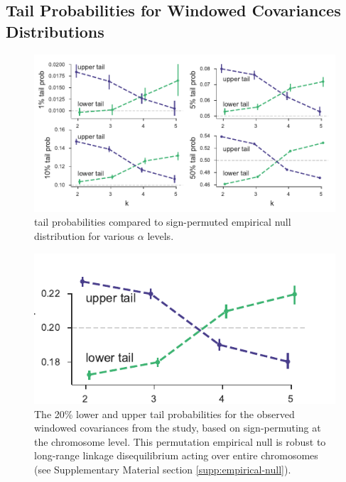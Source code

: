 \documentclass[11pt]{article}
\begin{document}
\clearpage
\subsection{\textcite{Barghi2019-qy} Tail Probabilities for Windowed Covariances Distributions}

\begin{figure}[!ht]
  \centering
  \includegraphics[]{figures/barghi-tailprobs-panels.pdf}

  \caption{\textcite{Barghi2019-qy} tail probabilities compared to
  sign-permuted empirical null distribution for various $\alpha$ levels.}

  \label{suppfig:barghi-tailprobs-panels}
\end{figure}

\begin{figure}[!ht]
  \centering

  \includegraphics[]{figures/barghi-tailprobs-seqid-20.pdf}

  \caption{The 20\% lower and upper tail probabilities for the observed
    windowed covariances from the \textcite{Barghi2019-qy} study, based on
    sign-permuting at the chromosome level. This permutation empirical null is
    robust to long-range linkage disequilibrium acting over entire chromosomes
  (see Supplementary Material section \ref{supp:empirical-null}).}

  \label{suppfig:barghi-tailprobs-seqid}
\end{figure}
\end{document}
